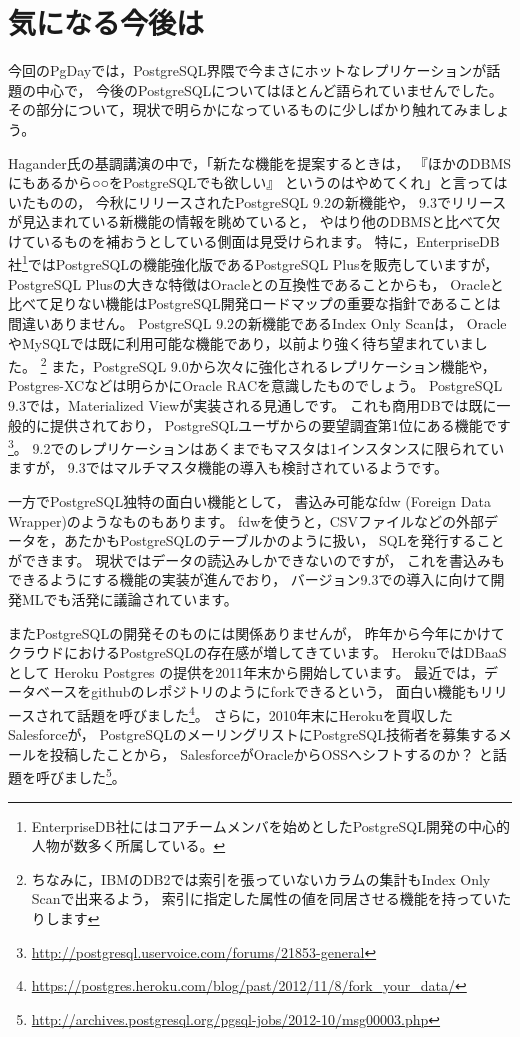 \section{気になる今後は}

今回のPgDayでは，PostgreSQL界隈で今まさにホットなレプリケーションが話題の中心で，
今後のPostgreSQLについてはほとんど語られていませんでした。
その部分について，現状で明らかになっているものに少しばかり触れてみましょう。

Hagander氏の基調講演の中で，「新たな機能を提案するときは，
『ほかのDBMSにもあるから○○をPostgreSQLでも欲しい』
というのはやめてくれ」と言ってはいたものの，
今秋にリリースされたPostgreSQL 9.2の新機能や，
9.3でリリースが見込まれている新機能の情報を眺めていると，
やはり他のDBMSと比べて欠けているものを補おうとしている側面は見受けられます。
特に，EnterpriseDB社\footnote{EnterpriseDB社にはコアチームメンバを始めとしたPostgreSQL開発の中心的人物が数多く所属している。}ではPostgreSQLの機能強化版であるPostgreSQL Plusを販売していますが，
PostgreSQL Plusの大きな特徴はOracleとの互換性であることからも，
Oracleと比べて足りない機能はPostgreSQL開発ロードマップの重要な指針であることは間違いありません。
PostgreSQL 9.2の新機能であるIndex Only Scanは，
OracleやMySQLでは既に利用可能な機能であり，以前より強く待ち望まれていました。
\footnote{ちなみに，IBMのDB2では索引を張っていないカラムの集計もIndex Only Scanで出来るよう，
索引に指定した属性の値を同居させる機能を持っていたりします}
また，PostgreSQL 9.0から次々に強化されるレプリケーション機能や，
Postgres-XCなどは明らかにOracle RACを意識したものでしょう。
PostgreSQL 9.3では，Materialized Viewが実装される見通しです。
これも商用DBでは既に一般的に提供されており，
PostgreSQLユーザからの要望調査第1位にある機能です\footnote{\url{http://postgresql.uservoice.com/forums/21853-general}}。
9.2でのレプリケーションはあくまでもマスタは1インスタンスに限られていますが，
9.3ではマルチマスタ機能の導入も検討されているようです。

一方でPostgreSQL独特の面白い機能として，
書込み可能なfdw (Foreign Data Wrapper)のようなものもあります。
fdwを使うと，CSVファイルなどの外部データを，あたかもPostgreSQLのテーブルかのように扱い，
SQLを発行することができます。
現状ではデータの読込みしかできないのですが，
これを書込みもできるようにする機能の実装が進んでおり，
バージョン9.3での導入に向けて開発MLでも活発に議論されています。

またPostgreSQLの開発そのものには関係ありませんが，
昨年から今年にかけてクラウドにおけるPostgreSQLの存在感が増してきています。
HerokuではDBaaSとして Heroku Postgres の提供を2011年末から開始しています。
最近では，データベースをgithubのレポジトリのようにforkできるという，
面白い機能もリリースされて話題を呼びました\footnote{\url{https://postgres.heroku.com/blog/past/2012/11/8/fork_your_data/}}。
さらに，2010年末にHerokuを買収したSalesforceが，
PostgreSQLのメーリングリストにPostgreSQL技術者を募集するメールを投稿したことから，
SalesforceがOracleからOSSへシフトするのか？
と話題を呼びました\footnote{\url{http://archives.postgresql.org/pgsql-jobs/2012-10/msg00003.php}}。
